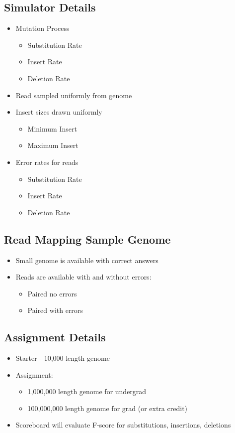 \documentclass[10pt]{article}
\begin{document}
\subsection*{Simulator Details}
\begin{itemize}
    \item Mutation Process
    \begin{itemize}
        \item Substitution Rate
        \item Insert Rate
        \item Deletion Rate
    \end{itemize}
    \item Read sampled uniformly from genome
    \item Insert sizes drawn uniformly
    \begin{itemize}
        \item Minimum Insert
        \item Maximum Insert
    \end{itemize}
    \item Error rates for reads
    \begin{itemize}
        \item Substitution Rate
        \item Insert Rate
        \item Deletion Rate
    \end{itemize}
\end{itemize}
\subsection*{Read Mapping Sample Genome}
\begin{itemize}
    \item Small genome is available with correct answers
    \item Reads are available with and without errors:
    \begin{itemize}
        \item Paired no errors
        \item Paired with errors
    \end{itemize}
\end{itemize}
\subsection*{Assignment Details}
\begin{itemize}
    \item Starter - 10,000 length genome
    \item Assignment:
    \begin{itemize}
        \item 1,000,000 length genome for undergrad
        \item 100,000,000 length genome for grad (or extra credit)
    \end{itemize}
    \item Scoreboard will evaluate F-score for substitutions, insertions, deletions
\end{itemize}
\end{document}
